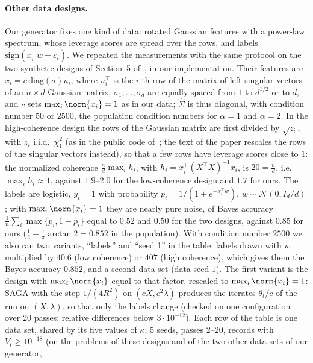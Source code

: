 \paragraph{Other data designs.}
Our generator fixes one kind of data: rotated Gaussian features with a power-law spectrum, whose leverage scores are
spread over the rows, and labels $\mathrm{sign}(x_i^\top w+\varepsilon_i)$. We repeated the measurements with the same
protocol on the two synthetic designs of Section~5 of~\cite{na2023hessian}, in our implementation. Their features are
$x_i=c\,\mathrm{diag}(\sigma)u_i$, where $u_i^\top$ is the $i$-th row of the matrix of left singular vectors of an
$n\times d$ Gaussian matrix, $\sigma_1,\dots,\sigma_d$ are equally spaced from $1$ to $d^{1/2}$ or to $d$, and $c$ sets
$\max_i\norm{x_i}=1$ as in our data; $\hat\Sigma$ is thus diagonal, with condition number $50$ or $2500$, the population
condition numbers for $\alpha=1$ and $\alpha=2$. In the high-coherence design the rows of the Gaussian matrix are first
divided by $\sqrt{z_i}$, with $z_i$ i.i.d.\ $\chi^2_1$ (as in the public code of~\cite{na2023hessian}; the text of the
paper rescales the rows of the singular vectors instead), so that a few rows have leverage scores close to $1$: the
normalized coherence $\frac nd\max_ih_i$, with $h_i=x_i^\top(X^\top X)^{-1}x_i$, is $20=\frac nd$, i.e.\ $\max_ih_i\approx1$,
against $1.9$--$2.0$ for the low-coherence design and $1.7$ for ours. The labels are logistic, $y_i=1$ with
probability $p_i=1/(1+e^{-x_i^\top w})$, $w\sim\mathcal N(0,I_d/d)$; with $\max_i\norm{x_i}=1$ they are nearly pure noise,
of Bayes accuracy $\frac1n\sum_i\max\{p_i,1-p_i\}$ equal to $0.52$ and $0.50$ for the two designs, against $0.85$ for ours
($\frac12+\frac1\pi\arctan2=0.852$ in the population). With condition number $2500$ we also ran two variants, ``labels''
and ``seed 1'' in the table: labels drawn with $w$ multiplied by $40.6$ (low coherence) or $407$ (high coherence), which
gives them the Bayes accuracy $0.852$, and a second data set (data seed $1$). The first variant is the design with
$\max_i\norm{x_i}$ equal to that factor, rescaled to $\max_i\norm{x_i}=1$: SAGA with the step $1/(4R^2)$ on
$(cX,c^2\lambda)$ produces the iterates $\theta_t/c$ of the run on $(X,\lambda)$, so that only the labels change (checked on one configuration over 20 passes: relative differences below
$3\cdot10^{-12}$). Each row of the table is one data set, shared by its five values of $\kappa$; 5 seeds, passes 2--20,
records with $V_t\ge10^{-18}$ (on the problems of these designs and of the two other data sets of our generator,
